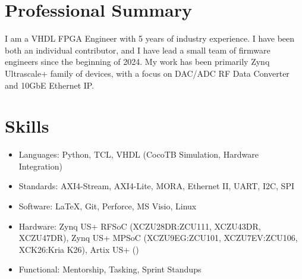 \documentclass[10pt,final,sans]{resume}
\begin{document}
\setlength\headheight{28pt} %

\section{Professional Summary}
\raggedright{I am a VHDL FPGA Engineer with 5 years of industry experience. I have been both an individual contributor, and I have lead a small team of firmware engineers since the beginning of 2024. My work has been primarily Zynq Ultrascale+ family of devices, with a focus on DAC/ADC RF Data Converter and 10GbE Ethernet IP.}

\section{Skills}
\begin{itemize}
  \item Languages: Python, TCL, VHDL (CocoTB Simulation, Hardware Integration)
  \item Standards: AXI4-Stream, AXI4-Lite, MORA, Ethernet II, UART, I2C, SPI
  \item Software: {\textrm \LaTeX}, Git, Perforce, MS Visio, Linux
  \item Hardware: Zynq US+ RFSoC (XCZU28DR:ZCU111, XCZU43DR, XCZU47DR), Zynq US+ MPSoC (XCZU9EG:ZCU101, XCZU7EV:ZCU106, XCK26:Kria K26), Artix US+ ()
  \item Functional: Mentorship, Tasking, Sprint Standups
\end{itemize}
\end{document}
